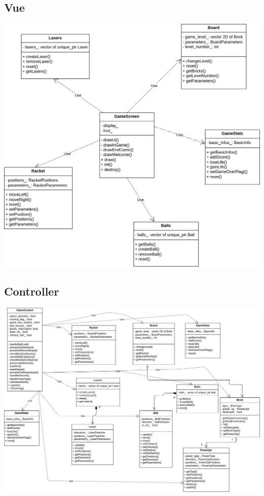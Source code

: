 \documentclass{article}
\begin{document}
\subsection{Vue}

\includegraphics[width=\textwidth]{view.png}


\subsection{Controller}

\includegraphics[width=\textwidth]{controller.png}
\end{document}

